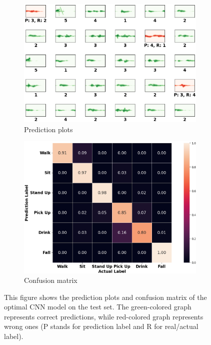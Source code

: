 \documentclass{l4proj}
\begin{document}
\begin{figure}[h]
    \centering
    \begin{subfigure}{0.4\textwidth}
        \includegraphics[width=\textwidth]{images/activity-final-test-prediction-plots.png}
        \caption{Prediction plots}
        \label{fig:activity-final-test-prediction-plots}
    \end{subfigure}
    \qquad
    \begin{subfigure}{0.4\textwidth}
        \includegraphics[width=\textwidth]{images/activity-final-test-confusion-matrix.png}
        \caption{Confusion matrix}
        \label{fig:activity-final-test-confusion-matrix}
    \end{subfigure}
    \caption{This figure shows the prediction plots  and confusion matrix  of the optimal CNN model on the test set. The green-colored graph represents correct predictions, while red-colored graph represents wrong ones (P stands for prediction label and R for real/actual label).}
    \label{fig:acitivity-final-prediction-plots-and-confusion-matrix}
\end{figure}
\end{document}
